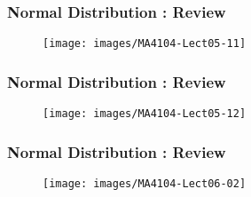 \documentclass{beamer}
\begin{document}
	\begin{frame}
		\frametitle{Normal Distribution : Review}
		\begin{figure}
			\centering
			\texttt{[image: images/MA4104-Lect05-11]}
			
		\end{figure}
	\end{frame}
	\begin{frame}
		\frametitle{Normal Distribution : Review}
		\begin{figure}
			\centering
			\texttt{[image: images/MA4104-Lect05-12]}
			
		\end{figure}
	\end{frame}
	\begin{frame}
		\frametitle{Normal Distribution : Review}
		\begin{figure}
			\centering
			\texttt{[image: images/MA4104-Lect06-02]}
			
		\end{figure}
	\end{frame}
\end{document}
